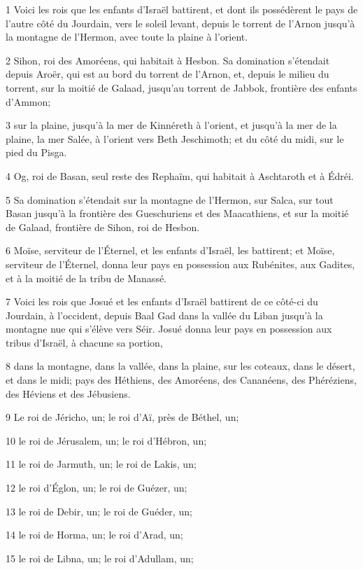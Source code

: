 \par 1 Voici les rois que les enfants d'Israël battirent, et dont ils possédèrent le pays de l'autre côté du Jourdain, vers le soleil levant, depuis le torrent de l'Arnon jusqu'à la montagne de l'Hermon, avec toute la plaine à l'orient.
\par 2 Sihon, roi des Amoréens, qui habitait à Hesbon. Sa domination s'étendait depuis Aroër, qui est au bord du torrent de l'Arnon, et, depuis le milieu du torrent, sur la moitié de Galaad, jusqu'au torrent de Jabbok, frontière des enfants d'Ammon;
\par 3 sur la plaine, jusqu'à la mer de Kinnéreth à l'orient, et jusqu'à la mer de la plaine, la mer Salée, à l'orient vers Beth Jeschimoth; et du côté du midi, sur le pied du Pisga.
\par 4 Og, roi de Basan, seul reste des Rephaïm, qui habitait à Aschtaroth et à Édréi.
\par 5 Sa domination s'étendait sur la montagne de l'Hermon, sur Salca, sur tout Basan jusqu'à la frontière des Gueschuriens et des Maacathiens, et sur la moitié de Galaad, frontière de Sihon, roi de Hesbon.
\par 6 Moïse, serviteur de l'Éternel, et les enfants d'Israël, les battirent; et Moïse, serviteur de l'Éternel, donna leur pays en possession aux Rubénites, aux Gadites, et à la moitié de la tribu de Manassé.
\par 7 Voici les rois que Josué et les enfants d'Israël battirent de ce côté-ci du Jourdain, à l'occident, depuis Baal Gad dans la vallée du Liban jusqu'à la montagne nue qui s'élève vers Séir. Josué donna leur pays en possession aux tribus d'Israël, à chacune sa portion,
\par 8 dans la montagne, dans la vallée, dans la plaine, sur les coteaux, dans le désert, et dans le midi; pays des Héthiens, des Amoréens, des Cananéens, des Phéréziens, des Héviens et des Jébusiens.
\par 9 Le roi de Jéricho, un; le roi d'Aï, près de Béthel, un;
\par 10 le roi de Jérusalem, un; le roi d'Hébron, un;
\par 11 le roi de Jarmuth, un; le roi de Lakis, un;
\par 12 le roi d'Églon, un; le roi de Guézer, un;
\par 13 le roi de Debir, un; le roi de Guéder, un;
\par 14 le roi de Horma, un; le roi d'Arad, un;
\par 15 le roi de Libna, un; le roi d'Adullam, un;
